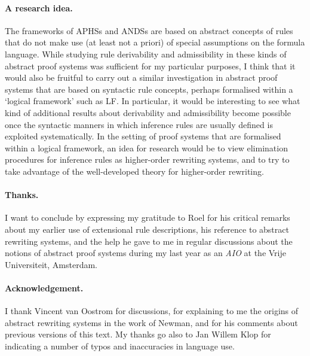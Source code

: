 \documentclass[envcountsame,runningheads]{llncs}
\newcommand{\APHS}{A\hspace*{-0.3pt}P\hspace*{-0.6pt}H\hspace*{-0.4pt}S}
\newcommand{\ANDS}{ANDS}
\begin{document}
\paragraph{A research idea.}
The frameworks of \APHS{s} and \ANDS{s} are based on abstract concepts of rules
that do not make use (at least not a priori) of special assumptions
on the formula language. 
While studying rule derivability and admissibility in these kinds
of abstract proof systems was sufficient for my particular purposes,
I think that it would also be fruitful to carry out a similar investigation
in abstract proof systems that are based on syntactic rule concepts,
perhaps 
formalised within a `logical framework' such as LF.
In particular, it would be interesting to see what kind of additional results 
about derivability and admissibility become possible 
once the syntactic manners in which inference rules are usually
defined is exploited systematically.
In the setting of proof systems that are formalised within a logical framework,
an idea for research would be to view elimination procedures for inference rules 
as higher-order rewriting systems, and to try to take advantage of 
the well-developed theory for higher-order rewriting. 

\paragraph{Thanks.}
I want to conclude by expressing my gratitude to Roel 
for his critical remarks about my earlier use of extensional rule descriptions,
his reference to abstract rewriting systems,
and the help he gave to me in regular discussions about the notions
of abstract proof systems during my last year as an \emph{AIO}
at the Vrije Universiteit, Amsterdam.


\paragraph{Acknowledgement.}
I thank Vincent van Oostrom for discussions,
  for explaining to me the origins of abstract rewriting systems
  in the work of Newman,
  and for his comments about previous versions of this text.
  My thanks go also to Jan Willem Klop for indicating a number of
  typos and inaccuracies in language use. 




\end{document}
